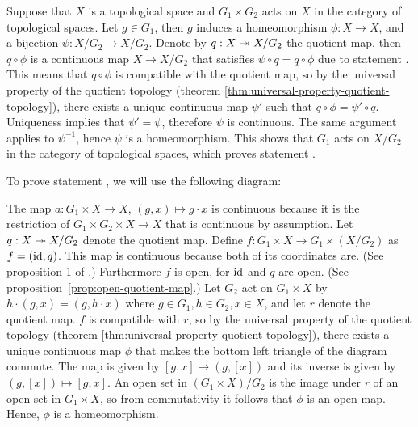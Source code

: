 Suppose that $X$ is a topological space
and $G_1 \times G_2$ acts on $X$ in the category of topological spaces.
Let $g \in G_1$, then $g$ induces a homeomorphism $\phi : X \to X$,
and a bijection $\psi : X / G_2 \to X / G_2$.
Denote by $q : X \twoheadrightarrow X / G_2$ the quotient map,
then $q \circ \phi$ is a continuous map $X \to X / G_2$
that satisfies $\psi \circ q = q \circ \phi$ due to statement .
This means that $q \circ \phi$ is compatible with the quotient map,
so by the universal property of the quotient topology (theorem \ref{thm:universal-property-quotient-topology}),
there exists a unique continuous map $\psi'$ such that $q \circ \phi = \psi' \circ q$.
Uniqueness implies that $\psi' = \psi$,
therefore $\psi$ is continuous.
The same argument applies to $\psi^{-1}$,
hence $\psi$ is a homeomorphism.
This shows that $G_1$ acts on $X / G_2$ in the category of topological spaces,
which proves statement .

To prove statement ,
we will use the following diagram:
\begin{center}
\end{center}
The map $a : G_1 \times X \to X$,
$(g, x) \mapsto g \cdot x$
is continuous because it is the restriction of $G_1 \times G_2 \times X \to X$
that is continuous by assumption.
Let $q: X \twoheadrightarrow X / G_2$ denote the quotient map.
Define $f : G_1 \times X \to G_1 \times {(X / G_2)}$ as $f = (\operatorname{id}, q)$.
This map is continuous because both of its coordinates are.
(See proposition 1 of \parencite[ch.~\textsc{i}, \S~4.1]{bourbaki1971}.)
Furthermore $f$ is open,
for $\operatorname{id}$ and $q$ are open. (See proposition~\ref{prop:open-quotient-map}.)
Let $G_2$ act on $G_1 \times X$ by $h \cdot (g, x) = (g, h \cdot x)$
where $g \in G_1, h \in G_2, x \in X$,
and let $r$ denote the quotient map.
$f$ is compatible with $r$,
so by the universal property of the quotient topology (theorem \ref{thm:universal-property-quotient-topology}),
there exists a unique continuous map
$\phi$ that makes the bottom left triangle of the diagram commute.
The map is given by $[g, x] \mapsto (g, [x])$
and its inverse is given by $(g, [x]) \mapsto [g, x]$.
An open set in $(G_1 \times X) / G_2$
is the image under $r$ of an open set in $G_1 \times X$,
so from commutativity it follows that $\phi$ is an open map.
Hence, $\phi$ is a homeomorphism.

